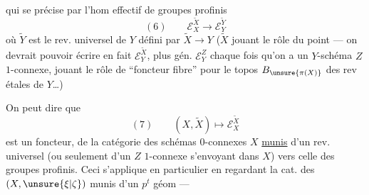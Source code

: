 
qui se précise par l'hom effectif de groupes profinis
\[
(6)\qquad \mathcal E_X^{\widetilde X}\longrightarrow\mathcal E_Y^{\widetilde Y}
\]
où $\widetilde Y$ est le rev. universel de $Y$ défini par $\widetilde X\longrightarrow Y$ ($\widetilde X$ jouant le rôle du point --- on devrait pouvoir écrire en fait $\mathcal E_Y^{\widetilde X}$, plus gén. $\mathcal E_Y^Z$ chaque fois qu'on a un $Y$-schéma $Z$ $1$-connexe, jouant le rôle de ``foncteur fibre'' pour le topos $B_{\unsure{\pi(X)}}$ des rev étales de $Y$\ldots)


On peut dire que
\[
(7)\qquad (X,\widetilde X)\longmapsto\mathcal E_X^{\widetilde X}
\]
est un foncteur, de la catégorie des schémas $0$-connexes $X$ \uline{munis} d'un rev. universel (ou seulement d'un $Z$ $1$-connexe s'envoyant dans $X$) vers celle des groupes profinis. Ceci s'applique en particulier en regardant la cat. des $(X,\unsure{\xi|\zeta})$ munis d'un $p^t$ géom ---

